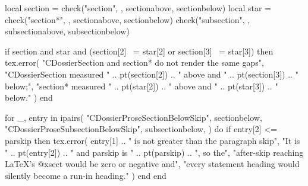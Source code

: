 \documentclass{careerdossier-statement}
\begin{document}
{  local section = check("section", \number\CDossierGapSectionBox, sectionabove, sectionbelow)
  local star = check("section*", \number\CDossierGapStarBox, sectionabove, sectionbelow)
  check("subsection", \number\CDossierGapSubsectionBox, subsectionabove, subsectionbelow)

  if section and star
      and (section[2] ~= star[2] or section[3] ~= star[3]) then
    tex.error(
      "CDossierSection and section* do not render the same gaps",
      {
        "CDossierSection measured " .. pt(section[2]) .. " above and " ..
          pt(section[3]) .. " below;",
        "section* measured " .. pt(star[2]) .. " above and " ..
          pt(star[3]) .. " below."
      }
    )
  end

  for _, entry in ipairs({
    {"CDossierProseSectionBelowSkip", sectionbelow},
    {"CDossierProseSubsectionBelowSkip", subsectionbelow},
  }) do
    if entry[2] <= parskip then
      tex.error(
        entry[1] .. " is not greater than the paragraph skip",
        {
          "It is " .. pt(entry[2]) .. " and parskip is " .. pt(parskip) .. ", so the",
          "after-skip reaching LaTeX's @xsect would be zero or negative and",
          "every statement heading would silently become a run-in heading."
        }
      )
    end
  end
}

\box\CDossierGapSectionBox
\box\CDossierGapStarBox
\box\CDossierGapSubsectionBox
\end{document}
